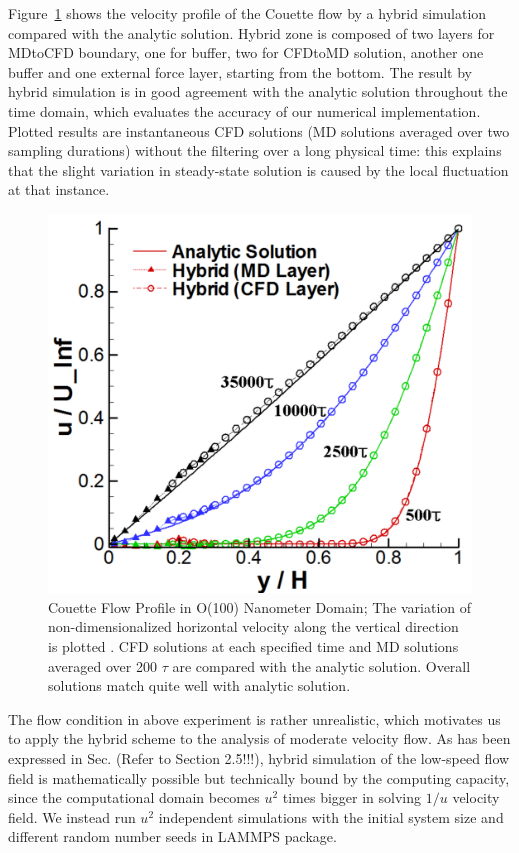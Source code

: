 \documentclass[preprint,12pt]{elsarticle}
\begin{document}
Figure~\ref{Flat_Plate_Sol_L} shows the velocity profile of the Couette flow by a hybrid simulation compared with the analytic solution. Hybrid zone is composed of two layers for MDtoCFD boundary, one for buffer, two for CFDtoMD solution, another one buffer and one external force layer, starting from the bottom. The result by hybrid simulation is in good agreement with the analytic solution throughout the time domain, which evaluates the accuracy of our numerical implementation. Plotted results are instantaneous CFD solutions (MD solutions averaged over two sampling durations) without the filtering over a long physical time: this explains that the slight variation in steady-state solution is caused by the local fluctuation at that instance.


\begin{figure}
\centering
\includegraphics[width=0.6\linewidth]{Couette_Large.pdf}
\vskip-0.2cm
\caption{\small Couette Flow Profile in O(100) Nanometer Domain; The variation of non-dimensionalized horizontal velocity along the vertical direction is plotted . CFD solutions at each specified time and MD solutions averaged over 200 $\tau$ are compared with the analytic solution. Overall solutions match quite well with analytic solution.}
\label{Flat_Plate_Sol_L}
\end{figure}


The flow condition in above experiment is rather unrealistic, which motivates us to apply the hybrid scheme to the analysis of moderate velocity flow. As has been expressed in Sec. (Refer to Section 2.5!!!), hybrid simulation of the low-speed flow field is mathematically possible but technically bound by the computing capacity, since the computational domain becomes $u^2$ times bigger in solving $1/u$ velocity field. We instead run $u^2$ independent simulations with the initial system size and different random number seeds in LAMMPS package. %
\end{document}
